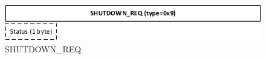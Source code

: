 \documentclass[]{article}
\begin{document}
\begin{figure}[H]
\centering
\includegraphics[width=\textwidth]{frames/shutdown-req.pdf}
\caption{SHUTDOWN\_REQ}
\label{SHUTDOWN-REQ}
\end{figure}
\end{document}
